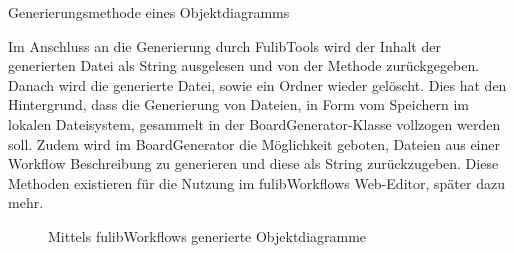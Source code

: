\begin{listing}[!ht]
    \inputminted[xleftmargin=20pt,linenos,firstnumber=95]{java}{listings/3.1.4/ObjectGeneration.java}
    \caption{Generierungsmethode eines Objektdiagramms}
    \label{listing:object-gen}
\end{listing}

Im Anschluss an die Generierung durch FulibTools wird der Inhalt der generierten Datei als String ausgelesen und von der Methode zurückgegeben.
Danach wird die generierte Datei, sowie ein Ordner wieder gelöscht.
Dies hat den Hintergrund, dass die Generierung von Dateien, in Form vom Speichern im lokalen Dateisystem, gesammelt in der BoardGenerator-Klasse vollzogen werden soll.
Zudem wird im BoardGenerator die Möglichkeit geboten, Dateien aus einer Workflow Beschreibung zu generieren und diese als String zurückzugeben.
Diese Methoden existieren für die Nutzung im fulibWorkflows Web-Editor, später dazu mehr.

\begin{figure}%
    \centering
    \qquad
    \caption{Mittels fulibWorkflows generierte Objektdiagramme}%
    \label{fig:generated-object}%
\end{figure}


